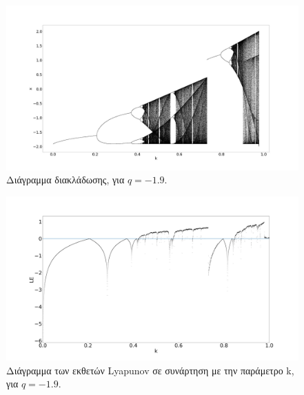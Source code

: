 \begin{figure}[ht]
	\centering
	\includegraphics[width=1\linewidth]{LateX images/graphs q19/g1}
	\caption{ Διάγραμμα διακλάδωσης, για  $q=-1.9$.}
	\label{f:g39}
\end{figure}

\begin{figure}[ht]
	\centering
	\includegraphics[width=1\linewidth]{LateX images/graphs q19/g2}
	\caption{Διάγραμμα των εκθετών Lyapunov σε συνάρτηση με την παράμετρο k, για  $q=-1.9$.}
	\label{f:g40}
\end{figure}

